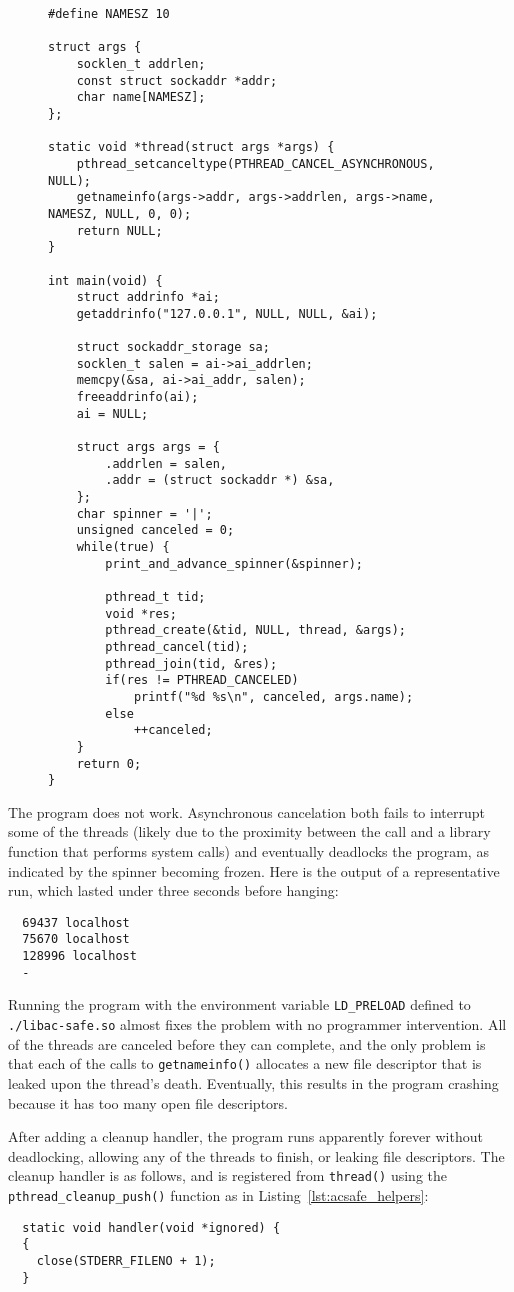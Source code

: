 \begin{figure}
\begin{lstlisting}[label=lst:acsafe_example,caption=Example program using asynchronous thread cancellation]
#define NAMESZ 10

struct args {
	socklen_t addrlen;
	const struct sockaddr *addr;
	char name[NAMESZ];
};

static void *thread(struct args *args) {
	pthread_setcanceltype(PTHREAD_CANCEL_ASYNCHRONOUS, NULL);
	getnameinfo(args->addr, args->addrlen, args->name, NAMESZ, NULL, 0, 0);
	return NULL;
}

int main(void) {
	struct addrinfo *ai;
	getaddrinfo("127.0.0.1", NULL, NULL, &ai);

	struct sockaddr_storage sa;
	socklen_t salen = ai->ai_addrlen;
	memcpy(&sa, ai->ai_addr, salen);
	freeaddrinfo(ai);
	ai = NULL;

	struct args args = {
		.addrlen = salen,
		.addr = (struct sockaddr *) &sa,
	};
	char spinner = '|';
	unsigned canceled = 0;
	while(true) {
		print_and_advance_spinner(&spinner);

		pthread_t tid;
		void *res;
		pthread_create(&tid, NULL, thread, &args);
		pthread_cancel(tid);
		pthread_join(tid, &res);
		if(res != PTHREAD_CANCELED)
			printf("%d %s\n", canceled, args.name);
		else
			++canceled;
	}
	return 0;
}
\end{lstlisting}
\end{figure}

The program does not work.  Asynchronous cancelation both fails to interrupt some
of the threads (likely due to the proximity between the call and a library
function that performs system calls) and eventually deadlocks the program, as
indicated by the spinner becoming frozen.  Here is the output of a representative
run, which lasted under three seconds before hanging:
\begin{lstlisting}
  69437 localhost
  75670 localhost
  128996 localhost
  -
\end{lstlisting}

Running the program with the environment variable \texttt{LD\_PRELOAD} defined to
\texttt{./libac-safe.so} almost fixes the problem with no programmer intervention.
All of the threads are canceled before they can complete, and the only problem is
that each of the calls to \texttt{getnameinfo()} allocates a new file descriptor that
is leaked upon the thread's death.  Eventually, this results in the program crashing
because it has too many open file descriptors.

After adding a cleanup handler, the program runs apparently forever without
deadlocking, allowing any of the threads to finish, or leaking file descriptors.  The
cleanup handler is as follows, and is registered from \texttt{thread()} using the
\texttt{pthread\_cleanup\_push()} function as in Listing~\ref{lst:acsafe_helpers}:
\begin{lstlisting}
  static void handler(void *ignored) {
  {
  	close(STDERR_FILENO + 1);
  }
\end{lstlisting}
